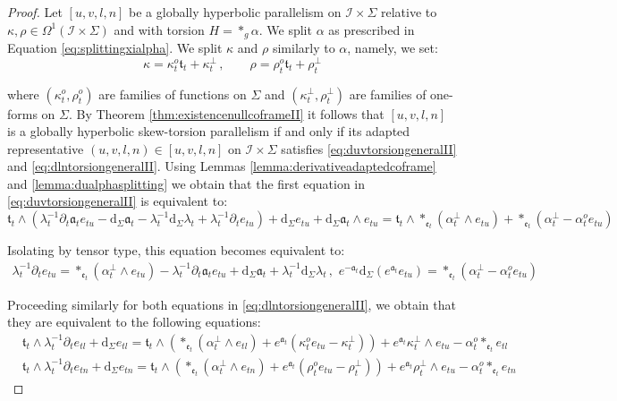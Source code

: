 \documentclass[10pt,reqno,a4paper]{amsart}
\theoremstyle{plain}
\theoremstyle{definition}
\theoremstyle{remark}
\theoremstyle{remark}
\newcommand{\frt}{\mathfrak{t}}
\def\dd{\mathrm{d}}
\def\cI{\mathcal{I}}
\def\fra{\mathfrak{a}}
\def\fre{\mathfrak{e}}
\renewcommand{\(}{ (}
\renewcommand{\)}{ )}
\begin{document}
\begin{proof}
Let $[u,v,l,n]$ be a globally hyperbolic parallelism on $\cI\times \Sigma$ relative to $\kappa , \rho \in \Omega^1(\cI\times\Sigma)$ and with torsion $H = \ast_{g} \alpha$. We split $\alpha$ as prescribed in Equation \eqref{eq:splittingxialpha}. We split $\kappa$ and $\rho$ similarly to $\alpha$, namely, we set:
\begin{equation*}
\kappa = \kappa^o_t \frt_t + \kappa^{\perp}_t\, ,\qquad \rho = \rho^o_t \frt_t + \rho^{\perp}_t
\end{equation*}
	
\noindent
where $(\kappa^o_t , \rho^o_t)$ are families of functions on $\Sigma$ and $(\kappa^{\perp}_t , \rho^{\perp}_t)$ are families of one-forms on $\Sigma$. By Theorem \ref{thm:existencenullcoframeII} it follows that $[u,v,l,n]$ is a globally hyperbolic skew-torsion parallelism if and only if its adapted representative $(u,v,l,n)\in [u,v,l,n]$ on $\cI\times \Sigma$ satisfies \eqref{eq:duvtorsiongeneralII} and \eqref{eq:dlntorsiongeneralII}. Using Lemmas \ref{lemma:derivativeadaptedcoframe} and \ref{lemma:dualphasplitting} we obtain that the first equation in \eqref{eq:duvtorsiongeneralII} is equivalent to:
\begin{equation*}
\frt_t \wedge (\lambda_t^{-1}\partial_t \fra_t e_{tu} - \dd_{\Sigma} \fra_t - \lambda_t^{-1} \dd_{\Sigma} \lambda_t + \lambda_t^{-1} \partial_t e_{tu}) + \dd_{\Sigma} e_{tu} + \dd_{\Sigma} \fra_t \wedge e_{tu} =  \frt_t  \wedge  \ast_{\fre_t} (\alpha^{\perp}_t \wedge e_{tu})  +  \ast_{\fre_t}(\alpha^{\perp}_t   - \alpha^o_t e_{tu}) 
\end{equation*}
	
\noindent
Isolating by tensor type, this equation becomes equivalent to:
\begin{eqnarray}
\label{eq:partialeuproof}
\lambda_t^{-1} \partial_t e_{tu} = \ast_{\fre_t} (\alpha^{\perp}_t \wedge e_{tu}) - \lambda_t^{-1}\partial_t \fra_t e_{tu} + \dd_{\Sigma} \fra_t + \lambda_t^{-1} \dd_{\Sigma} \lambda_t\, , \,\,  e^{-\fra_t} \dd_{\Sigma} (e^{\fra_t} e_{tu} ) = \ast_{\fre_t}(\alpha^{\perp}_t  - \alpha^o_t e_{tu}) 
\end{eqnarray}
	
\noindent
Proceeding similarly for both equations in \eqref{eq:dlntorsiongeneralII}, we obtain that they are equivalent to the following equations:
\begin{eqnarray*}
& \frt_t \wedge \lambda_t^{-1} \partial_t e_{tl} + \dd_{\Sigma} e_{tl} =  \frt_t  \wedge (\ast_{\fre_t} (\alpha^{\perp}_t  \wedge e_{tl}) + e^{\fra_t} (\kappa^o_t e_{tu} - \kappa^{\perp}_t)) + e^{\fra_t} \kappa^{\perp}_t\wedge e_{tu} - \alpha^o_t \ast_{\fre_t} e_{tl} \\
& \frt_t \wedge \lambda_t^{-1} \partial_t e_{tn} + \dd_{\Sigma} e_{tn} = \frt_t  \wedge (\ast_{\fre_t} (\alpha^{\perp}_t \wedge e_{tn}) +   e^{\fra_t} (\rho^o_t e_{tu} - \rho^{\perp}_t)) +  e^{\fra_t} \rho^{\perp}_t\wedge e_{tu}  - \alpha^o_t \ast_{\fre_t} e_{tn}  
\end{eqnarray*}
	

\end{proof}
\end{document}

